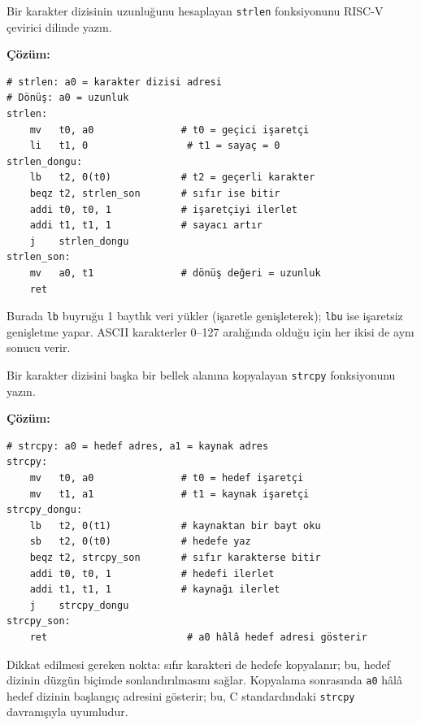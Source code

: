 \begin{ornek}[4.9]
\label{orn:strlen}
Bir karakter dizisinin uzunluğunu hesaplayan \texttt{strlen} fonksiyonunu RISC-V çevirici dilinde yazın.

\textbf{Çözüm:}

\begin{lstlisting}[style=riscv]
# strlen: a0 = karakter dizisi adresi
# Dönüş: a0 = uzunluk
strlen:
    mv   t0, a0               # t0 = geçici işaretçi
    li   t1, 0                 # t1 = sayaç = 0
strlen_dongu:
    lb   t2, 0(t0)            # t2 = geçerli karakter
    beqz t2, strlen_son       # sıfır ise bitir
    addi t0, t0, 1            # işaretçiyi ilerlet
    addi t1, t1, 1            # sayacı artır
    j    strlen_dongu
strlen_son:
    mv   a0, t1               # dönüş değeri = uzunluk
    ret
\end{lstlisting}

Burada \texttt{lb} buyruğu 1 baytlık veri yükler (işaretle genişleterek); \texttt{lbu} ise işaretsiz genişletme yapar. ASCII karakterler 0--127 aralığında olduğu için her ikisi de aynı sonucu verir.
\end{ornek}

\begin{ornek}[4.10]
\label{orn:strcpy}
Bir karakter dizisini başka bir bellek alanına kopyalayan \texttt{strcpy} fonksiyonunu yazın.

\textbf{Çözüm:}

\begin{lstlisting}[style=riscv]
# strcpy: a0 = hedef adres, a1 = kaynak adres
strcpy:
    mv   t0, a0               # t0 = hedef işaretçi
    mv   t1, a1               # t1 = kaynak işaretçi
strcpy_dongu:
    lb   t2, 0(t1)            # kaynaktan bir bayt oku
    sb   t2, 0(t0)            # hedefe yaz
    beqz t2, strcpy_son       # sıfır karakterse bitir
    addi t0, t0, 1            # hedefi ilerlet
    addi t1, t1, 1            # kaynağı ilerlet
    j    strcpy_dongu
strcpy_son:
    ret                        # a0 hâlâ hedef adresi gösterir
\end{lstlisting}

Dikkat edilmesi gereken nokta: sıfır karakteri de hedefe kopyalanır; bu, hedef dizinin düzgün biçimde sonlandırılmasını sağlar. Kopyalama sonrasında \texttt{a0} hâlâ hedef dizinin başlangıç adresini gösterir; bu, C standardındaki \texttt{strcpy} davranışıyla uyumludur.
\end{ornek}

